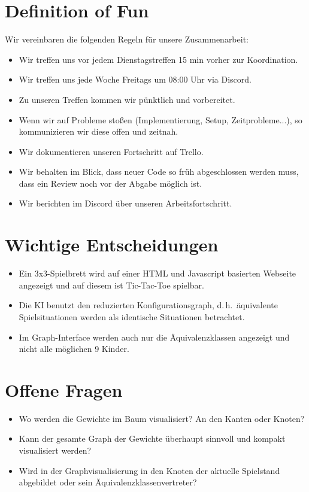 \documentclass[titlepage]{scrartcl}
\begin{document}
\section{Definition of Fun}%
Wir vereinbaren die folgenden Regeln für unsere Zusammenarbeit:
\begin{itemize}
	\item Wir treffen uns vor jedem Dienstagstreffen 15 min vorher zur Koordination.
	\item Wir treffen uns jede Woche Freitags um 08:00 Uhr via Discord.
	\item Zu unseren Treffen kommen wir pünktlich und vorbereitet.
	\item Wenn wir auf Probleme stoßen (Implementierung, Setup, Zeitprobleme...), so kommunizieren wir diese offen und zeitnah.
	\item Wir dokumentieren unseren Fortschritt auf Trello.
	\item Wir behalten im Blick, dass neuer Code so früh abgeschlossen werden muss, dass ein Review noch vor der Abgabe möglich ist.
	\item Wir berichten im Discord über unseren Arbeitsfortschritt.
\end{itemize}

\section{Wichtige Entscheidungen}
\begin{itemize}
	\item Ein 3x3-Spielbrett wird auf einer HTML und Javascript basierten Webseite angezeigt und auf diesem ist Tic-Tac-Toe spielbar.
	\item Die KI benutzt den reduzierten Konfigurationsgraph, d.\,h.\ äquivalente Spielsituationen werden als identische Situationen betrachtet.
	\item Im Graph-Interface werden auch nur die Äquivalenzklassen angezeigt und nicht alle möglichen 9 Kinder.
\end{itemize}

\section{Offene Fragen}
\begin{itemize}
	\item Wo werden die Gewichte im Baum visualisiert? An den Kanten oder Knoten?
	\item Kann der gesamte Graph der Gewichte überhaupt sinnvoll und kompakt visualisiert werden?
	\item Wird in der Graphvisualisierung in den Knoten der aktuelle Spielstand abgebildet oder sein Äquivalenzklassenvertreter?
\end{itemize}
\end{document}
